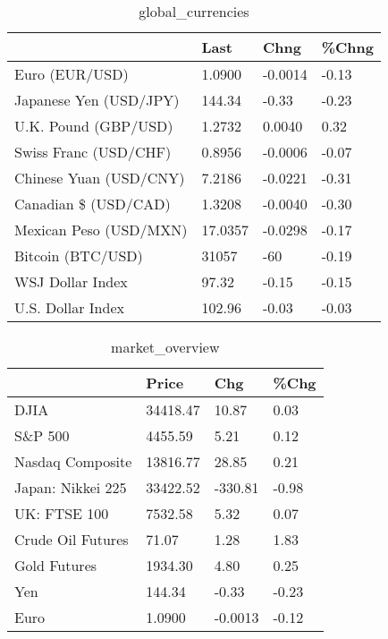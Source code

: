 \documentclass{article}%
\begin{document}
%


\begin{table}[htbp]%
\caption{global\_currencies}%
\centering%
\begin{adjustbox}{width=1\textwidth}%
\begin{tabular}{llll}
\toprule
                       &    Last &    Chng & \%Chng \\
\midrule
        Euro (EUR/USD) &  1.0900 & -0.0014 & -0.13 \\
Japanese Yen (USD/JPY) &  144.34 &   -0.33 & -0.23 \\
  U.K. Pound (GBP/USD) &  1.2732 &  0.0040 &  0.32 \\
 Swiss Franc (USD/CHF) &  0.8956 & -0.0006 & -0.07 \\
Chinese Yuan (USD/CNY) &  7.2186 & -0.0221 & -0.31 \\
  Canadian \$ (USD/CAD) &  1.3208 & -0.0040 & -0.30 \\
Mexican Peso (USD/MXN) & 17.0357 & -0.0298 & -0.17 \\
     Bitcoin (BTC/USD) &   31057 &     -60 & -0.19 \\
      WSJ Dollar Index &   97.32 &   -0.15 & -0.15 \\
     U.S. Dollar Index &  102.96 &   -0.03 & -0.03 \\
\bottomrule
\end{tabular}
%
\end{adjustbox}%
\end{table}

%


\begin{table}[htbp]%
\caption{market\_overview}%
\centering%
\begin{adjustbox}{width=1\textwidth}%
\begin{tabular}{llll}
\toprule
                  &    Price &     Chg &  \%Chg \\
\midrule
             DJIA & 34418.47 &   10.87 &  0.03 \\
          S\&P 500 &  4455.59 &    5.21 &  0.12 \\
 Nasdaq Composite & 13816.77 &   28.85 &  0.21 \\
Japan: Nikkei 225 & 33422.52 & -330.81 & -0.98 \\
     UK: FTSE 100 &  7532.58 &    5.32 &  0.07 \\
Crude Oil Futures &    71.07 &    1.28 &  1.83 \\
     Gold Futures &  1934.30 &    4.80 &  0.25 \\
              Yen &   144.34 &   -0.33 & -0.23 \\
             Euro &   1.0900 & -0.0013 & -0.12 \\
\bottomrule
\end{tabular}
%
\end{adjustbox}%
\end{table}

%
\end{document}
